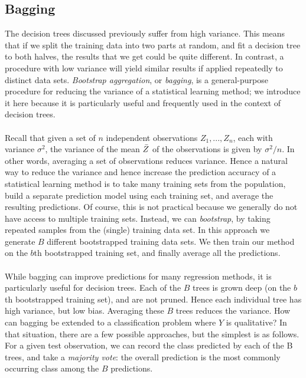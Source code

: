 \subsection{Bagging}
The decision trees discussed previously suffer from high variance. This means that if we split the training data into two parts at random, and fit a decision tree to both halves, the results that we get could be quite different. In contrast, a procedure with low variance will yield similar results if applied repeatedly to distinct data sets. \textit{Bootstrap aggregation}, or \textit{bagging}, is a general-purpose procedure for reducing the variance of a statistical learning method; we introduce it here because it is particularly useful and frequently used in the context of decision trees.\\\\
Recall that given a set of $n$ independent observations $Z_1,...,Z_n$, each
with variance $\sigma^2$, the variance of the mean $\Bar{Z}$ of the observations is given by $\sigma^2/n$. In other words, averaging a set of observations reduces variance. Hence a natural way to reduce the variance and hence increase the prediction accuracy of a statistical learning method is to take many training sets from the population, build a separate prediction model using each training set, and average the resulting predictions. Of course, this is not practical because we generally do not have access to multiple training sets. Instead, we can \textit{bootstrap}, by taking repeated samples from the (single) training data set. In this approach we generate $B$ different bootstrapped training data sets. We then train our method on the $b$th bootstrapped training set, and finally average all the predictions. 
\\\\
While bagging can improve predictions for many regression methods, it is particularly useful for decision trees. Each of the $B$ trees is grown deep (on the $b$th bootstrapped training set), and are not pruned. Hence each individual tree has high variance, but low bias. Averaging these $B$ trees reduces the variance. How can bagging be extended to a classification problem where $Y$ is qualitative? In that situation, there are a few possible approaches, but the simplest is as follows. For a given test observation, we can record the class predicted by each of the B trees, and take a \textit{majority vote}: the overall prediction is the most commonly occurring class among the $B$ predictions.

